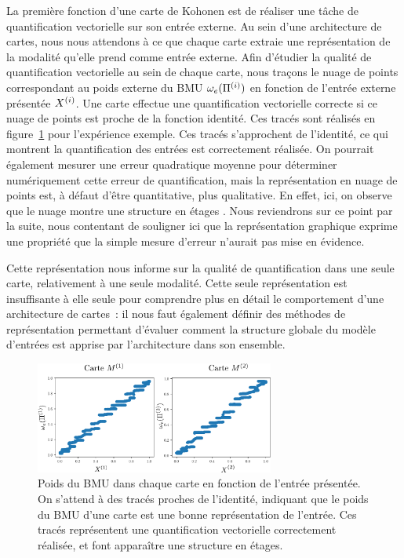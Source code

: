 \documentclass[../main]{subfiles}
\begin{document}
La première fonction d'une carte de Kohonen est de réaliser une tâche de quantification vectorielle sur son entrée externe. 
Au sein d'une architecture de cartes, nous nous attendons à ce que chaque carte extraie une représentation de la modalité qu'elle prend comme entrée externe.
Afin d'étudier la qualité de quantification vectorielle au sein de chaque carte, nous traçons le nuage de points correspondant au poids externe du BMU $\omega_e(\Pi^{({i})})$ en fonction de l'entrée externe présentée $X^{({i})}$. 
Une carte effectue une quantification vectorielle correcte si ce nuage de points est proche de la fonction identité.
Ces tracés sont réalisés en figure~\ref{fig:erreur} pour l'expérience exemple. Ces tracés s'approchent de l'identité, ce qui montrent la quantification des entrées est correctement réalisée.
On pourrait également mesurer une erreur quadratique moyenne pour déterminer numériquement cette erreur de quantification, mais la représentation en nuage de points est, à défaut d'être quantitative, plus qualitative. 
En effet, ici, on observe que le nuage montre une structure \og en étages \fg{}. Nous reviendrons sur ce point par la suite, nous contentant de souligner ici que la représentation graphique exprime une propriété que la simple mesure d'erreur n'aurait pas mise en évidence.

Cette représentation nous informe sur la qualité de quantification dans une seule carte, relativement à une seule modalité. Cette seule représentation est insuffisante à elle seule pour comprendre plus en détail le comportement d'une architecture de cartes~: il nous faut également définir des méthodes de représentation permettant d'évaluer comment la structure globale du modèle d'entrées est apprise par l'architecture dans son ensemble.

\begin{figure}
    \centering
    \includegraphics[width=0.7\textwidth]{w_x.pdf}
    \caption{Poids du BMU dans chaque carte en fonction de l'entrée présentée. On s'attend à des tracés proches de l'identité, indiquant que le poids du BMU d'une carte est une bonne représentation de l'entrée. 
    Ces tracés représentent une quantification vectorielle correctement réalisée, et font apparaître une structure en étages.
     \label{fig:erreur}}
\end{figure}
\end{document}
